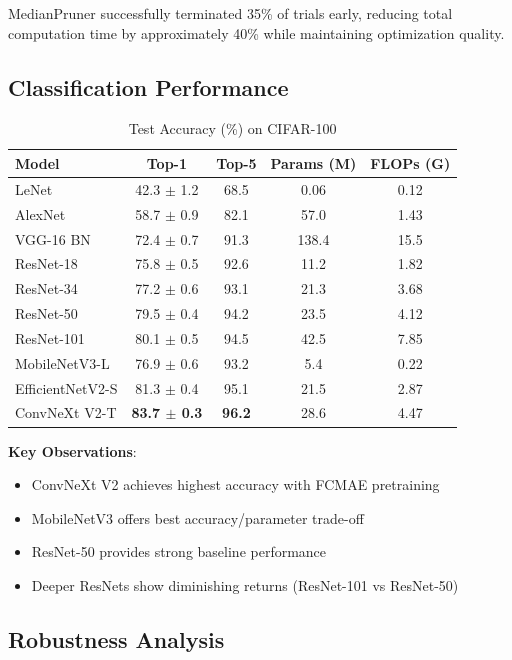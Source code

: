MedianPruner successfully terminated 35\% of trials early, reducing total computation time by approximately 40\% while maintaining optimization quality.

\subsection{Classification Performance}

\begin{table}[h]
\centering
\caption{Test Accuracy (\%) on CIFAR-100}
\begin{tabular}{lcccc}
\hline
\textbf{Model} & \textbf{Top-1} & \textbf{Top-5} & \textbf{Params (M)} & \textbf{FLOPs (G)} \\
\hline
LeNet & 42.3 $\pm$ 1.2 & 68.5 & 0.06 & 0.12 \\
AlexNet & 58.7 $\pm$ 0.9 & 82.1 & 57.0 & 1.43 \\
VGG-16 BN & 72.4 $\pm$ 0.7 & 91.3 & 138.4 & 15.5 \\
\hline
ResNet-18 & 75.8 $\pm$ 0.5 & 92.6 & 11.2 & 1.82 \\
ResNet-34 & 77.2 $\pm$ 0.6 & 93.1 & 21.3 & 3.68 \\
ResNet-50 & 79.5 $\pm$ 0.4 & 94.2 & 23.5 & 4.12 \\
ResNet-101 & 80.1 $\pm$ 0.5 & 94.5 & 42.5 & 7.85 \\
\hline
MobileNetV3-L & 76.9 $\pm$ 0.6 & 93.2 & 5.4 & 0.22 \\
EfficientNetV2-S & 81.3 $\pm$ 0.4 & 95.1 & 21.5 & 2.87 \\
ConvNeXt V2-T & \textbf{83.7 $\pm$ 0.3} & \textbf{96.2} & 28.6 & 4.47 \\
\hline
\end{tabular}
\end{table}

\textbf{Key Observations}:
\begin{itemize}
    \item ConvNeXt V2 achieves highest accuracy with FCMAE pretraining
    \item MobileNetV3 offers best accuracy/parameter trade-off
    \item ResNet-50 provides strong baseline performance
    \item Deeper ResNets show diminishing returns (ResNet-101 vs ResNet-50)
\end{itemize}

\subsection{Robustness Analysis}

